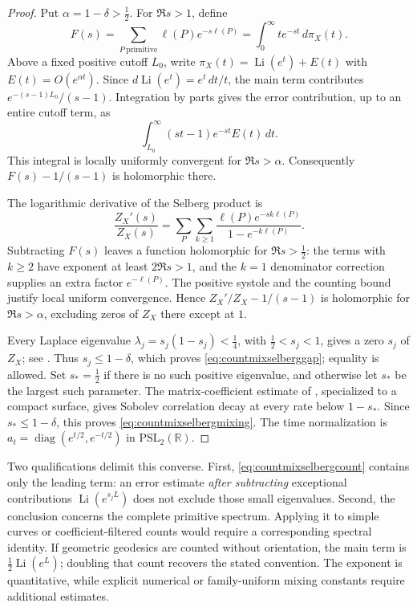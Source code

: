 \documentclass[11pt,a4paper]{article}
\numberwithin{equation}{section}
\theoremstyle{definition}
\theoremstyle{remark}
\begin{document}
\begin{proof}
Put $\alpha=1-\delta>\tfrac12$. For $\Re s>1$, define
\[
 F(s)=\sum_{P\ \mathrm{primitive}}\ell(P)e^{-s\ell(P)}
     =\int_0^\infty t e^{-st}\,d\pi_X(t).
\]
Above a fixed positive cutoff $L_0$, write
$\pi_X(t)=\operatorname{Li}(e^t)+E(t)$ with
$E(t)=O(e^{\alpha t})$. Since
$d\operatorname{Li}(e^t)=e^t\,dt/t$, the main term contributes
$e^{-(s-1)L_0}/(s-1)$. Integration by parts gives the error contribution,
up to an entire cutoff term, as
\[
 \int_{L_0}^\infty (st-1)e^{-st}E(t)\,dt.
\]
This integral is locally uniformly convergent for $\Re s>\alpha$.
Consequently $F(s)-1/(s-1)$ is holomorphic there.

The logarithmic derivative of the Selberg product is
\begin{equation}
 \frac{Z_X'(s)}{Z_X(s)}
 =\sum_P\sum_{k\geq1}
       \frac{\ell(P)e^{-sk\ell(P)}}{1-e^{-k\ell(P)}}.
 \label{eq:countmixselberglogderivative}
\end{equation}
Subtracting $F(s)$ leaves a function holomorphic for $\Re s>\tfrac12$:
the terms with $k\geq2$ have exponent at least $2\Re s>1$, and the
$k=1$ denominator correction supplies an extra factor $e^{-\ell(P)}$.
The positive systole and the counting bound justify local uniform
convergence. Hence $Z_X'/Z_X-1/(s-1)$ is holomorphic for
$\Re s>\alpha$, excluding zeros of $Z_X$ there except at $1$.

Every Laplace eigenvalue $\lambda_j=s_j(1-s_j)<\tfrac14$, with
$\tfrac12<s_j<1$, gives a zero $s_j$ of $Z_X$; see
\cite[Theorems~1.1 and~4.1]{BJPZeta}. Thus $s_j\leq1-\delta$,
which proves \eqref{eq:countmixselberggap}; equality is allowed.
Set $s_*=\tfrac12$ if there is no such positive eigenvalue, and otherwise
let $s_*$ be the largest such parameter. The matrix-coefficient estimate
of \cite[Theorem~1.1]{EdwardsOhMixing}, specialized to a compact surface,
gives Sobolev correlation decay at every rate below $1-s_*$.
Since $s_*\leq1-\delta$, this proves
\eqref{eq:countmixselbergmixing}. The time normalization is
$a_t=\operatorname{diag}(e^{t/2},e^{-t/2})$ in
$\mathrm{PSL}_2(\mathbb R)$.
\end{proof}

Two qualifications delimit this converse. First,
\eqref{eq:countmixselbergcount} contains only the leading term:
an error estimate \emph{after subtracting} exceptional contributions
$\operatorname{Li}(e^{s_jL})$ does not exclude those small eigenvalues.
Second, the conclusion concerns the complete primitive spectrum.
Applying it to simple curves or coefficient-filtered counts would require
a corresponding spectral identity. If geometric geodesics are counted
without orientation, the main term is
$\tfrac12\operatorname{Li}(e^L)$; doubling that count recovers the stated
convention. The exponent is quantitative, while explicit numerical or
family-uniform mixing constants require additional estimates.
\end{document}
